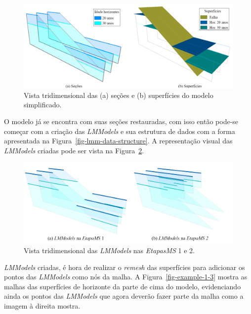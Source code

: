 \begin{figure} [H]
  \begin{center}
    \includegraphics[width=400pt]{images/fig-example-1-1}
    \caption{Vista tridimensional das (a) seções e (b) superfícies do modelo simplificado.}\label{fig-example-1-1}
  \end{center}
\end{figure}

O modelo já se encontra com suas seções restauradas, com isso então pode-se começar com a criação das \textit{LMModels} e sua estrutura de dados com a forma apresentada na Figura~\ref{fig-lmm-data-structure}. A representação visual das \textit{LMModels} criadas pode ser vista na Figura~\ref{fig-example-1-2}.

\begin{figure} [h]
  \begin{center}
    \includegraphics[width=\textwidth]{images/fig-example-1-2}
    \caption{Vista tridimensional das \textit{LMModels} nas \textit{EtapasMS} 1 e 2.}\label{fig-example-1-2}
  \end{center}
\end{figure}

\textit{LMModels} criadas, é hora de realizar o \textit{remesh} das superfícies para adicionar os pontos das \textit{LMModels} como nós da malha. A Figura~\ref{fig-example-1-3} mostra as malhas das superfícies de horizonte da parte de cima do modelo, evidenciando ainda os pontos das \textit{LMModels} que agora deverão fazer parte da malha como a imagem à direita mostra.


